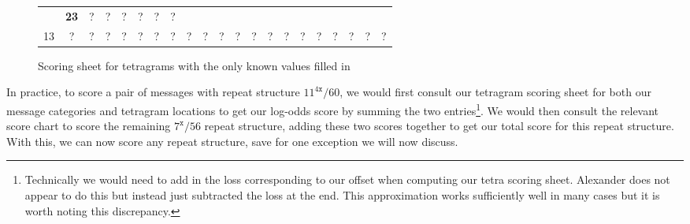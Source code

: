 \begin{figure}[H]
\begin{center}
{\begin{tabular}{|c|*{20}{c|}}
          & {\bf{23}}      & ?            & ?             & ?
          & ?              & ?            & ?                             \\
          13            & ?              & ?            & ?             & ?
          & ?              & ?            & ?             & ?           &
          ?             & ?              & ?            & ?             & ?
          & ?              & ?            & ?             & ?
          & ?              & ?            & ?                             \\
          \hline
      \end{tabular}}
    \end{center}
    \caption{Scoring sheet for tetragrams with the only known values filled in}
  \end{figure}
  \noindent In practice, to score a pair of messages with repeat structure
  $11^{4\texttt{x}}/60$, we would first consult our tetragram scoring
  sheet for both our message categories and tetragram locations to get our
  log-odds score by summing the two entries\footnote{Technically we
    would need to add in the loss corresponding to our offset when
    computing our tetra scoring sheet. Alexander does not appear to do
    this but instead just subtracted the loss at the end. This
    approximation works sufficiently well in many cases but it is worth
  noting this discrepancy. }. We would then consult the relevant
  score chart to score
  the remaining $7^\texttt{x}/56$ repeat structure, adding these two
  scores together to get our total score for this repeat structure.
  With this, we can now score any repeat structure, save for one
  exception we will now discuss.

